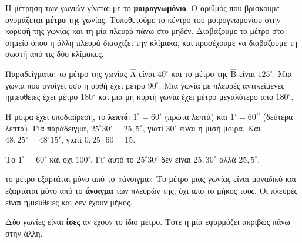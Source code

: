 Η μέτρηση των γωνιών γίνεται με το \textbf{μοιρογνωμόνιο}. Ο αριθμός που βρίσκουμε ονομάζεται \textbf{μέτρο} της γωνίας. Τοποθετούμε το κέντρο του μοιρογνωμονίου στην κορυφή της γωνίας και τη μία πλευρά πάνω στο μηδέν. Διαβάζουμε το μέτρο στο σημείο όπου η άλλη πλευρά διασχίζει την κλίμακα, και προσέχουμε να διαβάζουμε τη σωστή από τις δύο κλίμακες.

\begin{center}
\end{center}

Παραδείγματα: το μέτρο της γωνίας $\hat{\mathrm{Α}}$ είναι $40^\circ$ και το μέτρο της $\hat{\mathrm{Β}}$ είναι $125^\circ$. Μια γωνία που ανοίγει όσο η ορθή έχει μέτρο $90^\circ$. Μια γωνία με πλευρές αντικείμενες ημιευθείες έχει μέτρο $180^\circ$ και μια μη κυρτή γωνία έχει μέτρο μεγαλύτερο από $180^\circ$.

Η μοίρα έχει υποδιαίρεση, το \textbf{λεπτό}: $1^\circ=60'$ (πρώτα λεπτά) και $1'=60''$ (δεύτερα λεπτά). Για παράδειγμα, $25^\circ30'=25{,}5^\circ$, γιατί $30'$ είναι η μισή μοίρα. Και $48{,}25^\circ=48^\circ15'$, γιατί $0{,}25\cdot60=15$.

\begin{prosoxi}
Το $1^\circ=60'$ και όχι $100'$. Γι' αυτό το $25^\circ30'$ δεν είναι $25{,}30^\circ$ αλλά $25{,}5^\circ$.
\end{prosoxi}

\begin{kanonas}{το μέτρο εξαρτάται μόνο από το «άνοιγμα»}
Το μέτρο μιας γωνίας είναι μοναδικό και εξαρτάται μόνο από το \textbf{άνοιγμα} των πλευρών της, όχι από το μήκος τους. Οι πλευρές είναι ημιευθείες και δεν έχουν μήκος.
\end{kanonas}


Δύο γωνίες είναι \textbf{ίσες} αν έχουν το ίδιο μέτρο. Τότε η μία εφαρμόζει ακριβώς πάνω στην άλλη.

